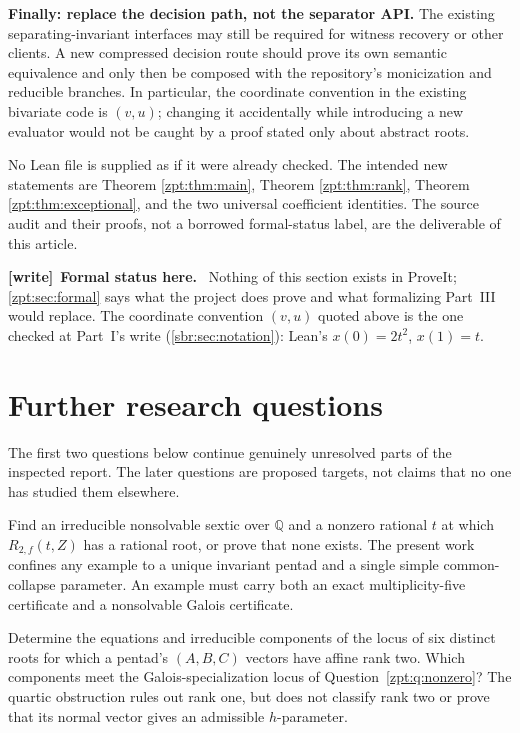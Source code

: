 \documentclass[11pt,letterpaper]{article}
\numberwithin{equation}{section}
\theoremstyle{definition}
\theoremstyle{remark}
\newcommand{\QQ}{\mathbb Q}
\newenvironment{writenote}[1][]{\par\smallskip\begingroup\small
 \noindent\textbf{[write]}\if\relax\detokenize{#1}\relax\else~\textbf{#1.}\fi\ }%
 {\par\endgroup\smallskip}
\begin{document}
\textbf{Finally: replace the decision path, not the separator API.}
The existing separating-invariant interfaces may still be required for
witness recovery or other clients. A new compressed decision route should
prove its own semantic equivalence and only then be composed with the
repository's monicization and reducible branches. In particular, the
coordinate convention in the existing bivariate code is $(v,u)$;
changing it accidentally while introducing a new evaluator would not be
caught by a proof stated only about abstract roots.

No Lean file is supplied as if it were already checked. The intended new
statements are Theorem \ref{zpt:thm:main}, Theorem \ref{zpt:thm:rank}, Theorem
\ref{zpt:thm:exceptional}, and the two universal coefficient identities.
The source audit and their proofs, not a borrowed formal-status label,
are the deliverable of this article.

\begin{writenote}[Formal status here]
Nothing of this section exists in ProveIt; \cref{zpt:sec:formal} says what
the project does prove and what formalizing Part~III would replace. The
coordinate convention $(v,u)$ quoted above is the one checked at Part~I's
write (\cref{sbr:sec:notation}): Lean's $x(0)=2t^2$, $x(1)=t$.
\end{writenote}

\section{Further research questions}
\label{zpt:sec:questions}
The first two questions below continue genuinely unresolved parts of the
inspected report. The later questions are proposed targets, not claims
that no one has studied them elsewhere.

\begin{question}
\label{zpt:q:nonzero}
Find an irreducible nonsolvable sextic over $\QQ$ and a nonzero rational
$t$ at which $R_{2,f}(t,Z)$ has a rational root, or prove that none exists.
The present work confines any example to a unique invariant pentad and a
single simple common-collapse parameter. An example must carry both an
exact multiplicity-five certificate and a nonsolvable Galois certificate.
\end{question}

\begin{question}
\label{zpt:q:rank-two}
Determine the equations and irreducible components of the locus of six
distinct roots for which a pentad's $(A,B,C)$ vectors have affine rank two.
Which components meet the Galois-specialization locus of Question~\ref{zpt:q:nonzero}?
The quartic obstruction rules out rank one, but does not classify rank
two or prove that its normal vector gives an admissible $h$-parameter.
\end{question}
\end{document}
